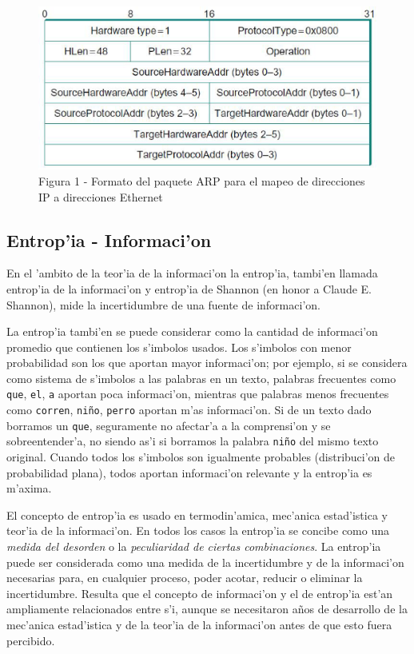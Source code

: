 \documentclass[a4paper,10pt]{article}
\begin{document}
\begin{figure}[!hbp]
\begin{center}
\includegraphics[width=12cm]{figura1.eps}
\end{center}
\caption{Figura 1 - Formato del paquete ARP para el mapeo de direcciones IP a direcciones Ethernet} \label{figura1}
\end{figure}

\subsection{Entrop'ia - Informaci'on}

En el 'ambito de la teor'ia de la informaci'on la entrop'ia, tambi'en llamada entrop'ia de la informaci'on y entrop'ia de Shannon (en honor a Claude E. Shannon), mide la incertidumbre de una fuente de informaci'on.

\vspace*{5 mm}
La entrop'ia tambi'en se puede considerar como la cantidad de informaci'on promedio que contienen los s'imbolos usados. Los s'imbolos con menor probabilidad son los que aportan mayor informaci'on; por ejemplo, si se considera como sistema de s'imbolos a las palabras en un texto, palabras frecuentes como \texttt{que}, \texttt{el}, \texttt{a} aportan poca informaci'on, mientras que palabras menos frecuentes como \texttt{corren}, \texttt{ni\~no}, \texttt{perro} aportan m'as informaci'on. Si de un texto dado borramos un \texttt{que}, seguramente no afectar'a a la comprensi'on y se sobreentender'a, no siendo as'i si borramos la palabra \texttt{ni\~no} del mismo texto original. Cuando todos los s'imbolos son igualmente probables (distribuci'on de probabilidad plana), todos aportan informaci'on relevante y la entrop'ia es m'axima.

\vspace*{5 mm}
El concepto de entrop'ia es usado en termodin'amica, mec'anica estad'istica y teor'ia de la informaci'on. En todos los casos la entrop'ia se concibe como una \textit{medida del desorden} o la \textit{peculiaridad de ciertas combinaciones}. La entrop'ia puede ser considerada como una medida de la incertidumbre y de la informaci'on necesarias para, en cualquier proceso, poder acotar, reducir o eliminar la incertidumbre. Resulta que el concepto de informaci'on y el de entrop'ia est'an ampliamente relacionados entre s'i, aunque se necesitaron a\~nos de desarrollo de la mec'anica estad'istica y de la teor'ia de la informaci'on antes de que esto fuera percibido.
\end{document}
